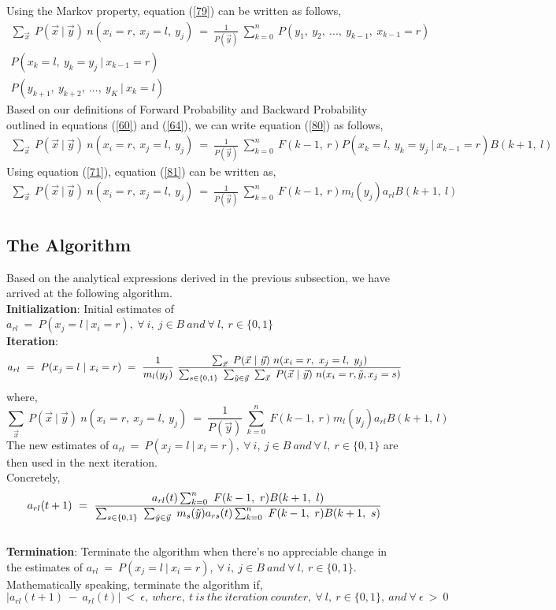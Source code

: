 \documentclass[12pt, draftcls, onecolumn]{IEEEtran}
\begin{document}
Using the Markov property, equation (\ref{79}) can be written as follows,
\begin{equation}\label{80}
    \begin{aligned}
        \sum_{\vec{x}}\ P(\vec{x}\ |\ \vec{y})\ n(x_i=r,\ x_j=l,\ y_j)\ =\ \frac{1}{P(\vec{y})}\ \sum_{k=0}^{n}\ P(y_1,\ y_2,\ ...,\ y_{k-1},\ x_{k-1}=r)\\P(x_{k}=l,\ y_k=y_j\ |\ x_{k-1}=r)\\P(y_{k+1},\ y_{k+2},\ ...,\ y_K\ |\ x_k=l)
    \end{aligned}
\end{equation}
Based on our definitions of Forward Probability and Backward Probability outlined in equations (\ref{60}) and (\ref{64}), we can write equation (\ref{80}) as follows,
\begin{equation}\label{81}
    \begin{aligned}
        \sum_{\vec{x}}\ P(\vec{x}\ |\ \vec{y})\ n(x_i=r,\ x_j=l,\ y_j)\ =\ \frac{1}{P(\vec{y})}\ \sum_{k=0}^{n}\ F(k-1,\ r)P(x_{k}=l,\ y_k=y_j\ |\ x_{k-1}=r)B(k+1,\ l)
    \end{aligned}
\end{equation}
Using equation (\ref{71}), equation (\ref{81}) can be written as,
\begin{equation}\label{82}
    \begin{aligned}
        \sum_{\vec{x}}\ P(\vec{x}\ |\ \vec{y})\ n(x_i=r,\ x_j=l,\ y_j)\ =\ \frac{1}{P(\vec{y})}\ \sum_{k=0}^{n}\ F(k-1,\ r)m_l(y_j)a_{rl}B(k+1,\ l)
    \end{aligned}
\end{equation}
\subsection{The Algorithm}
Based on the analytical expressions derived in the previous subsection, we have arrived at the following algorithm.
\\\textbf{Initialization}: Initial estimates of $a_{rl}\ =\ P(x_j=l\ |\ x_i=r),\ \forall\ i,\ j\in B\ and\ \forall\ l,\ r\in \{0,1\}$
\\\textbf{Iteration}: \[a_{rl}\ =\ P(x_j=l\ |\ x_i=r)\ =\ \frac{1}{m_l(y_j)}\ \frac{\sum_{\vec{x}}\ P(\vec{x}\ |\ \vec{y})\ n(x_i=r,\ x_j=l,\ y_j)}{\sum_{s\in\{0,1\}}\ \sum_{\Tilde{y}\in\vec{y}}\ \sum_{\vec{x}}\ P(\vec{x}\ |\ \vec{y})\ n(x_i=r,\Tilde{y},x_j=s)}\]
where,
\[\sum_{\vec{x}}\ P(\vec{x}\ |\ \vec{y})\ n(x_i=r,\ x_j=l,\ y_j)\ =\ \frac{1}{P(\vec{y})}\ \sum_{k=0}^{n}\ F(k-1,\ r)m_l(y_j)a_{rl}B(k+1,\ l)\]
The new estimates of $a_{rl}\ =\ P(x_j=l\ |\ x_i=r),\ \forall\ i,\ j\in B\ and\ \forall\ l,\ r\in \{0,1\}$ are then used in the next iteration.
\\Concretely,
\[a_{rl}(t+1)\ =\ \frac{a_{rl}(t)\sum_{k=0}^{n}\ F(k-1,\ r)B(k+1,\ l)}{\sum_{s\in\{0,1\}}\ \sum_{\Tilde{y}\in\vec{y}}\ m_s(\Tilde{y})a_{rs}(t)\sum_{k=0}^{n}\ F(k-1,\ r)B(k+1,\ s)}\]
\\\textbf{Termination}: Terminate the algorithm when there's no appreciable change in the estimates of $a_{rl}\ =\ P(x_j=l\ |\ x_i=r),\ \forall\ i,\ j\in B\ and\ \forall\ l,\ r\in \{0,1\}$. Mathematically speaking, terminate the algorithm if,
\[|a_{rl}(t+1)\ -\ a_{rl}(t)|\ <\ \epsilon,\ where,\ t\ is\ the\ iteration\ counter,\ \forall\ l,\ r\in\{0,1\},\ and\ \forall\ \epsilon\ >\ 0\]
\end{document}
